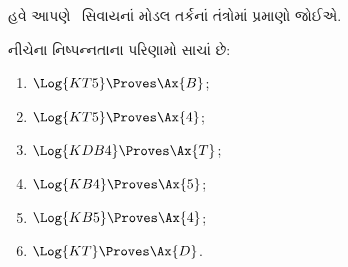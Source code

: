 \documentclass[../../../include/open-logic-section]{subfiles}
\begin{document}


હવે આપણે~ સિવાયનાં મોડલ તર્કનાં તંત્રોમાં પ્રમાણો જોઈએ.

\begin{prop}
નીચેના નિષ્પન્નતાના પરિણામો સાચાં છે:
  \begin{enumerate}
  \item $\Log{KT5} \Proves \Ax{B}$;
  \item $\Log{KT5} \Proves \Ax{4}$;
  \item $\Log{KDB4} \Proves \Ax{T}$;
  \item $\Log{KB4} \Proves \Ax{5}$;
  \item $\Log{KB5} \Proves \Ax{4}$;
  \item {}$\Log{KT} \Proves \Ax{D}$.
  \end{enumerate}
\end{prop}
\end{document}
